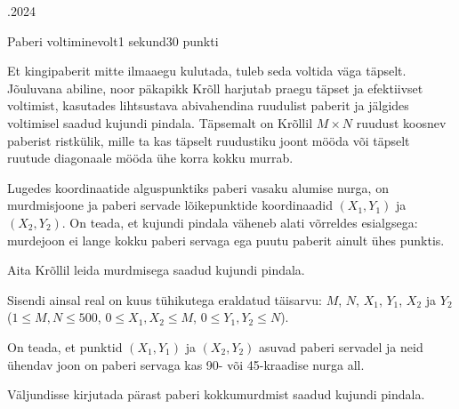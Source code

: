\documentclass[a4paper,11pt]{article}
\begin{document}
\begin{ol}{\eio}{.2024}{\yle}{}
\begin{yl}{3}{Paberi voltimine}{volt}{1 sekund}{30 punkti}

Et kingipaberit mitte ilmaaegu kulutada, tuleb seda voltida väga täpselt. Jõuluvana abiline, noor päkapikk Krõll harjutab praegu täpset ja efektiivset voltimist, kasutades lihtsustava abivahendina ruudulist paberit ja jälgides voltimisel saadud kujundi pindala.
Täpsemalt on Krõllil $M \times N$ ruudust koosnev paberist ristkülik, mille ta kas täpselt ruudustiku joont mööda või täpselt ruutude diagonaale mööda ühe korra kokku murrab.

Lugedes koordinaatide alguspunktiks paberi vasaku alumise nurga, on murdmisjoone ja paberi servade lõikepunktide koordinaadid $(X_1, Y_1)$ ja $(X_2, Y_2)$. On teada, et kujundi pindala väheneb alati võrreldes esialgsega: murdejoon ei lange kokku paberi servaga ega puutu paberit ainult ühes punktis.

Aita Krõllil leida murdmisega saadud kujundi pindala.
  
\sis Sisendi ainsal real on kuus tühikutega eraldatud täisarvu: $M$, $N$, $X_1$, $Y_1$, $X_2$ ja $Y_2$ ($1 \le M, N \le 500$, $0 \le X_1, X_2 \le M$, $0 \le Y_1, Y_2 \le N$).

On teada, et punktid $(X_1, Y_1)$ ja $(X_2, Y_2)$ asuvad paberi servadel ja neid ühendav joon on paberi servaga kas 90- või 45-kraadise nurga all.

\val Väljundisse kirjutada pärast paberi kokkumurdmist saadud kujundi pindala.

\nde[0]{3cm}{3cm}

\begin{center}
\end{center}

\nde[1]{3cm}{3cm}

\begin{center}
\end{center}


\end{yl}
\end{ol}
\end{document}
